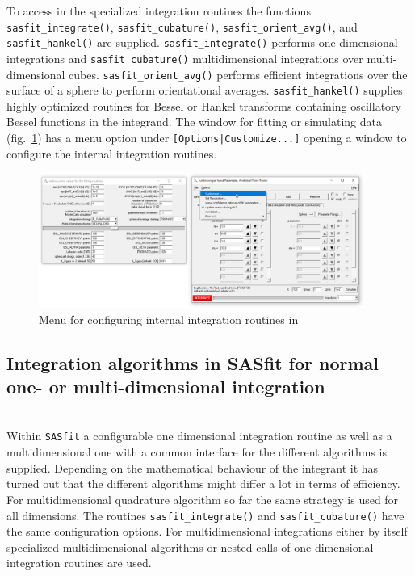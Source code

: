 To access in \SASfit the specialized integration routines the functions \texttt{sasfit\_integrate()}, \texttt{sasfit\_cubature()},
\texttt{sasfit\_orient\_avg()}, and \texttt{sasfit\_hankel()} are supplied.
\texttt{sasfit\_integrate()} performs one-dimensional integrations and \texttt{sasfit\_cubature()} multidimensional integrations over multi-dimensional cubes. \texttt{sasfit\_orient\_avg()} performs efficient integrations over the surface of a sphere to perform orientational averages. \texttt{sasfit\_hankel()} supplies highly optimized routines for Bessel or Hankel transforms containing oscillatory Bessel functions in the integrand. The window for fitting or simulating data (fig.\ \ref{fig:CustomizeIntGUI}) has a menu option under \texttt{[Options|Customize...]} opening a window to configure the internal integration routines.
\begin{figure}[htb]
\begin{center}
\includegraphics[width=0.95\textwidth]{../images/GUI/CustomizeWindow.pdf}
\end{center}
\caption{Menu for configuring internal integration routines in \SASfit}
\label{fig:CustomizeIntGUI}
\end{figure}

\subsection{Integration algorithms in SASfit for normal one- or multi-dimensional integration}  ~\\

Within \texttt{SASfit} a configurable one dimensional integration routine as well as a multidimensional one  with a common interface for the different algorithms is supplied. Depending on the mathematical behaviour of the integrant it has turned out that the different algorithms might differ a lot in terms of efficiency. For multidimensional quadrature algorithm so far the same strategy is used for all dimensions. The routines \texttt{sasfit\_integrate()}  and \texttt{sasfit\_cubature()} have the same configuration options. For multidimensional integrations either by itself specialized multidimensional algorithms or nested calls of one-dimensional integration routines are used. \\


